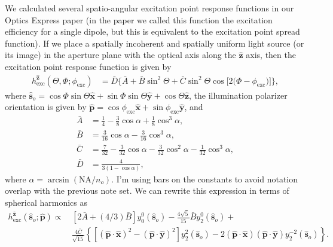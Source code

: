 \documentclass[11pt]{article}
\providecommand{\so}[1]{\mathbf{\hat{s}}_o}
\providecommand{\mh}[1]{\mathbf{\hat{#1}}}
\begin{document}
We calculated several spatio-angular excitation point response functions in our
Optics Express paper \cite{chandler17} (in the paper we called this function the
excitation efficiency for a single dipole, but this is equivalent to the
excitation point spread function). If we place a spatially incoherent and
spatially uniform light source (or its image) in the aperture plane with the
optical axis along the $\mh{z}$ axis, then the excitation point response function
is given by
\begin{align}
  h^{\mh{z}}_{\text{exc}}(\Theta, \Phi; \phi_{\text{exc}}) &= \bar{D}\{\bar{A} + \bar{B}\sin^{2}{\Theta} + \bar{C}\sin^{2}{\Theta} \cos{[2 (\Phi - \phi_{\text{exc}}})]\}\label{eq:scalarabs},
\end{align}
where
$\so{} = \cos\Phi\sin\Theta\mh{x} + \sin\Phi\sin\Theta\mh{y} + \cos\Theta\mh{z}$,
the illumination polarizer orientation is given by $\mh{p} = \cos\phi_{\text{exc}}\mh{x} + \sin\phi_{\text{exc}}\mh{y}$, and 
\begin{subequations}
\begin{align}
  \bar{A} &= \frac{1}{4} - \frac{3}{8} \cos{\alpha } + \frac{1}{8} \cos^{3}{\alpha },\\
  \bar{B} &= \frac{3}{16} \cos{\alpha } - \frac{3}{16} \cos^{3}{\alpha },\\
  \bar{C} &= \frac{7}{32} - \frac{3}{32} \cos{\alpha } - \frac{3}{32} \cos^{2}{\alpha } - \frac{1}{32} \cos^{3}{\alpha},\\
  \bar{D} &= \frac{4}{3(1 - \cos\alpha)},
\end{align}\label{eq:coefficients}%
\end{subequations}
where $\alpha = \arcsin(\text{NA}/n_o)$. I'm using bars on the constants to
avoid notation overlap with the previous note set. We can rewrite this
expression in terms of spherical harmonics as
\begin{align}
  h^{\mh{z}}_{\text{exc}}(\so{}; \mh{p}) \propto\, &[2\bar{A} + (4/3)\bar{B}]y_0^0(\so{}) - \frac{4\sqrt{5}}{15}\bar{B}y_2^0(\so{}) + \nonumber\\ &\frac{4\bar{C}}{\sqrt{15}}\left\{[(\mh{p}\cdot\mh{x})^2 - (\mh{p}\cdot\mh{y})^2]y_2^2(\so{}) - 2(\mh{p}\cdot\mh{x})(\mh{p}\cdot\mh{y})y_2^{-2}(\so{})\right\}. \label{eq:genpsf}
\end{align}
\end{document}
